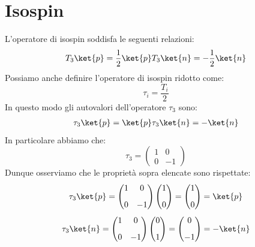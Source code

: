 \section{Isospin}
L'operatore di isospin soddisfa le seguenti relazioni:
\begin{equation}
 \begin{split}
  T_3 \ket{p}= \dfrac{1}{2}\ket{p}
  T_3 \ket{n}= -\dfrac{1}{2}\ket{n}
 \end{split}
\end{equation}
Possiamo anche definire l'operatore di isospin ridotto come:
\begin{equation}
 \tau_i = \dfrac{T_i}{2}
\end{equation}
In questo modo gli autovalori dell'operatore $\tau_3$ sono:
\begin{equation}
 \begin{split}
  \tau_3 \ket{p}= \ket{p}
  \tau_3 \ket{n}= -\ket{n}
 \end{split}
\end{equation}
In particolare abbiamo che:
\begin{equation}
 \tau_3 = \begin{pmatrix}
  1 & 0 \\[8pt]
  0 & -1
  \end{pmatrix}
\end{equation}
Dunque osserviamo che le proprietà sopra elencate sono rispettate:
\begin{equation}
  \tau_3 \ket{p} = \begin{pmatrix}
  1 & 0 \\[8pt]
  0 & -1
  \end{pmatrix} \begin{pmatrix}
  1 \\[8pt]
  0
  \end{pmatrix} = \begin{pmatrix}
  1 \\[8pt]
  0
  \end{pmatrix} = \ket{p}
\end{equation}
\begin{equation}
  \tau_3 \ket{n} = \begin{pmatrix}
  1 & 0 \\[8pt]
  0 & -1
  \end{pmatrix} \begin{pmatrix}
  0 \\[8pt]
  1
  \end{pmatrix} = \begin{pmatrix}
  0 \\[8pt]
  -1
  \end{pmatrix} = -\ket{n}
\end{equation}
